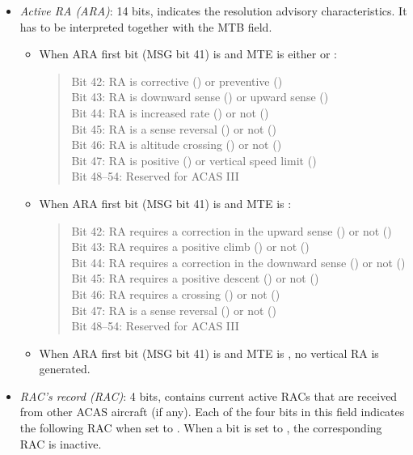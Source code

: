 \begin{itemize}
  \item \emph{Active RA (ARA)}: 14 bits, indicates the resolution advisory characteristics. It has to be interpreted together with the MTB field.

    \begin{itemize}
      \item When ARA first bit (MSG bit 41) is \1 and MTE is either \0 or \1:

      \begin{quote}
        \small
        Bit 42: RA is corrective (\1) or preventive (\0) \\
        Bit 43: RA is downward sense (\1) or upward sense (\0) \\
        Bit 44: RA is increased rate (\1) or not (\0) \\
        Bit 45: RA is a sense reversal (\1) or not (\0) \\
        Bit 46: RA is altitude crossing (\1) or not (\0) \\
        Bit 47: RA is positive (\1) or vertical speed limit (\0) \\
        Bit 48--54: Reserved for ACAS III
      \end{quote}

      \item When ARA first bit (MSG bit 41) is \0 and MTE is \1:

      \begin{quote}
        \small
        Bit 42: RA requires a correction in the upward sense (\1) or not (\0) \\
        Bit 43: RA requires a positive climb (\1) or not (\0) \\
        Bit 44: RA requires a correction in the downward sense (\1) or not (\0) \\
        Bit 45: RA requires a positive descent (\1) or not (\0) \\
        Bit 46: RA requires a crossing (\1) or not (\0) \\
        Bit 47: RA is a sense reversal (\1) or not (\0) \\
        Bit 48--54: Reserved for ACAS III
      \end{quote}

      \item When ARA first bit (MSG bit 41) is \0 and MTE is \0, no vertical RA is generated.
    \end{itemize}


  \item \emph{RAC's record (RAC)}: 4 bits, contains current active RACs that are received from other ACAS aircraft (if any). Each of the four bits in this field indicates the following RAC when set to \1. When a bit is set to \0, the corresponding RAC is inactive.


\end{itemize}
